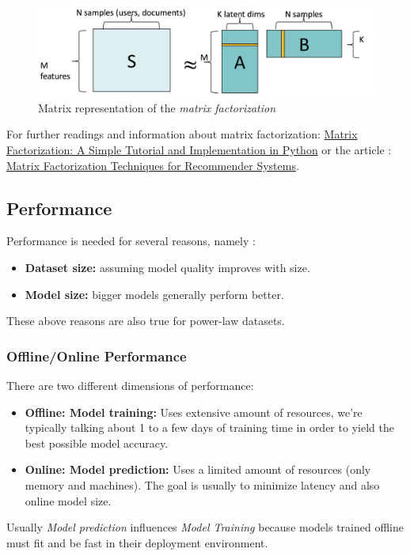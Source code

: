 \begin{figure}[H]%
 \centering
 \includegraphics[width=13cm]{./img/09/matrix_fact}
 \caption{\label{pic:matrix_fact} Matrix representation of the \emph{matrix factorization} }
\end{figure}

For further readings and information about matrix factorization: \href{http://www.quuxlabs.com/blog/2010/09/matrix-factorization-a-simple-tutorial-and-implementation-in-python/}{Matrix Factorization: A Simple Tutorial and Implementation in Python} or the article : \href{https://datajobs.com/data-science-repo/Recommender-Systems-[Netflix].pdf}{Matrix Factorization Techniques for Recommender Systems}.

\subsection{Performance}
Performance is needed for several reasons, namely :
\begin{itemize}
\item \textbf{Dataset size:} assuming model quality improves with size.
\item \textbf{Model size:} bigger models generally perform better.
\end{itemize}
These above reasons are also true for power-law datasets.

\subsubsection{Offline/Online Performance}
There are two different dimensions of performance:
\begin{itemize}
\item \textbf{Offline: Model training:} Uses extensive amount of resources, we're typically talking about 1 to a few days of training time in order to yield the best possible model accuracy.
\item \textbf{Online: Model prediction: }Uses a limited amount of resources (only memory and machines). The goal is usually to minimize latency and also online model size.
\end{itemize}
Usually \emph{Model prediction} influences \emph{Model Training} because models trained offline must fit and be fast in their deployment environment.

